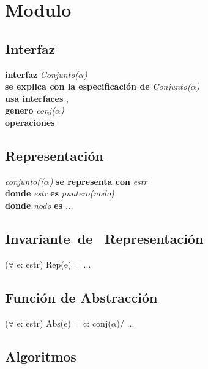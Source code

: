 \section*{Modulo }

\subsection*{Interfaz}
\textbf{interfaz} \textit{Conjunto($\alpha$)}\\
\textbf{se explica con la especificaci\'on de} \textit{Conjunto($\alpha$)}\\
\textbf{usa interfaces} , \\
\textbf{genero} \textit{conj($\alpha$)}\\
\textbf{operaciones}\\


\subsection*{Representaci\'on}
\textit{conjunto(($\alpha$)} \textbf{se representa con} \textit{estr}\\
\textbf{donde} \textit{estr} \textbf{es} \textit{puntero(nodo)}\\
\textbf{donde} \textit{nodo} \textbf{es} \textit{...}\\


\subsection*{Invariante\ de \ Representaci\'on}
\vspace{11pt}
($\forall$ e: estr) Rep(e) = ...
\vspace{33pt}


\subsection*{Funci\'on de Abstracci\'on}
\vspace{11pt}
($\forall$ e: estr) Abs(e) = c: conj($\alpha$)/ ...
\vspace{33pt}


\subsection*{Algoritmos}